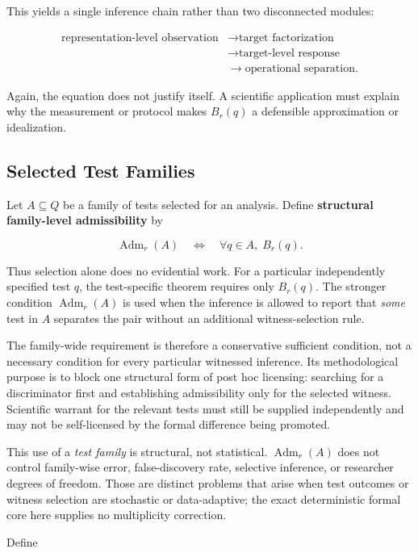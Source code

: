 \documentclass[12pt]{article}
\begin{document}
This yields a single inference chain rather than two disconnected modules:

\[
\begin{aligned}
\text{representation-level observation}
&\to \text{target factorization}\\
&\to \text{target-level response}\\
&\to \text{operational separation}.
\end{aligned}
\]

Again, the equation does not justify itself. A scientific application must explain why the measurement or protocol makes \(B_r(q)\) a defensible approximation or idealization.

\subsection{Selected Test Families}

Let \(A\subseteq Q\) be a family of tests selected for an analysis. Define \textbf{structural family-level admissibility} by

\[
\operatorname{Adm}_r(A)
\quad\Longleftrightarrow\quad
\forall q\in A,\;B_r(q).
\]

Thus selection alone does no evidential work. For a particular independently specified test \(q\), the test-specific theorem requires only \(B_r(q)\). The stronger condition \(\operatorname{Adm}_r(A)\) is used when the inference is allowed to report that \emph{some} test in \(A\) separates the pair without an additional witness-selection rule.

The family-wide requirement is therefore a conservative sufficient condition, not a necessary condition for every particular witnessed inference. Its methodological purpose is to block one structural form of post hoc licensing: searching for a discriminator first and establishing admissibility only for the selected witness. Scientific warrant for the relevant tests must still be supplied independently and may not be self-licensed by the formal difference being promoted.

This use of a \emph{test family} is structural, not statistical. \(\operatorname{Adm}_r(A)\) does not control family-wise error, false-discovery rate, selective inference, or researcher degrees of freedom. Those are distinct problems that arise when test outcomes or witness selection are stochastic or data-adaptive; the exact deterministic formal core here supplies no multiplicity correction.

Define
\end{document}
